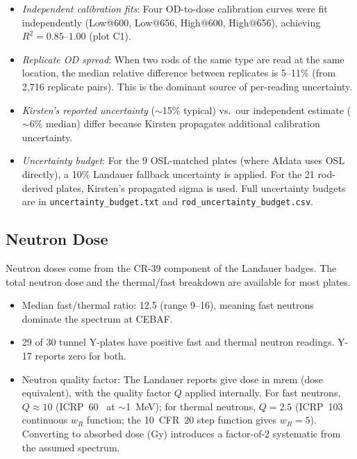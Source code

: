 \documentclass[11pt,letterpaper]{article}
\newcommand{\CEBAF}{CEBAF}
\begin{document}
\begin{itemize}
    \item \emph{Independent calibration fits}: Four OD-to-dose calibration
    curves were fit independently (Low@600, Low@656, High@600, High@656),
    achieving $R^2 = 0.85$--$1.00$ (plot C1).

    \item \emph{Replicate OD spread}: When two rods of the same type are
    read at the same location, the median relative difference between replicates
    is 5--11\% (from 2,716 replicate pairs). This is the dominant source of
    per-reading uncertainty.

    \item \emph{Kirsten's reported uncertainty} ($\sim$15\% typical) vs.\
    our independent estimate ($\sim$6\% median) differ because Kirsten
    propagates additional calibration uncertainty.

    \item \emph{Uncertainty budget}: For the 9 OSL-matched plates (where
    AIdata uses OSL directly), a 10\% Landauer fallback uncertainty is applied.
    For the 21 rod-derived plates, Kirsten's propagated sigma is used. Full
    uncertainty budgets are in \texttt{uncertainty\_budget.txt} and
    \texttt{rod\_uncertainty\_budget.csv}.
\end{itemize}

\subsection{Neutron Dose}

Neutron doses come from the CR-39 component of the Landauer badges. The total
neutron dose and the thermal/fast breakdown are available for most plates.

\begin{itemize}
    \item Median fast/thermal ratio: 12.5 (range 9--16), meaning fast
    neutrons dominate the spectrum at \CEBAF.
    \item 29 of 30 tunnel Y-plates have positive fast and thermal
    neutron readings. Y-17 reports zero for both.
    \item Neutron quality factor: The Landauer reports give dose in
    mrem (dose equivalent), with the quality factor $Q$ applied internally.
    For fast neutrons, $Q \approx 10$ (ICRP~60~\cite{ICRP60} at $\sim$\SI{1}{MeV}); for
    thermal neutrons, $Q = 2.5$ (ICRP~103 continuous $w_R$ function; the 10~CFR~20 step function gives $w_R = 5$). Converting to absorbed dose (Gy)
    introduces a factor-of-2 systematic from the assumed spectrum.
\end{itemize}
\end{document}
